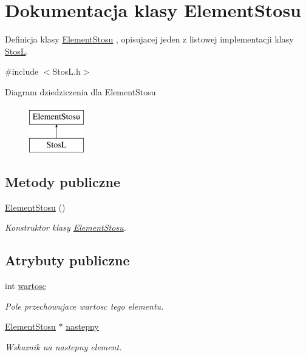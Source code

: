 \hypertarget{class_element_stosu}{\section{Dokumentacja klasy Element\-Stosu}
\label{class_element_stosu}
}


Definicja klasy \hyperlink{class_element_stosu}{Element\-Stosu} , opisujacej jeden z listowej implementacji klasy \hyperlink{class_stos_l}{Stos\-L}.  




{\ttfamily \#include $<$Stos\-L.\-h$>$}

Diagram dziedziczenia dla Element\-Stosu\begin{figure}[H]
\begin{center}
\leavevmode
\includegraphics[height=2.000000cm]{class_element_stosu}
\end{center}
\end{figure}
\subsection*{Metody publiczne}
\begin{DoxyCompactItemize}
\item 
\hyperlink{class_element_stosu_a0ee1750bbb83a84d1a73459d4f39897d}{Element\-Stosu} ()
\begin{DoxyCompactList}\small\item\em Konstruktor klasy \hyperlink{class_element_stosu}{Element\-Stosu}. \end{DoxyCompactList}\end{DoxyCompactItemize}
\subsection*{Atrybuty publiczne}
\begin{DoxyCompactItemize}
\item 
int \hyperlink{class_element_stosu_a78ebcb4f6af82fdcab2d8b458c4f05ab}{wartosc}
\begin{DoxyCompactList}\small\item\em Pole przechowujace wartosc tego elementu. \end{DoxyCompactList}\item 
\hyperlink{class_element_stosu}{Element\-Stosu} $\ast$ \hyperlink{class_element_stosu_a2f7c031eb0456369bac68a02c030601d}{nastepny}
\begin{DoxyCompactList}\small\item\em Wskaznik na nastepny element. \end{DoxyCompactList}\end{DoxyCompactItemize}


